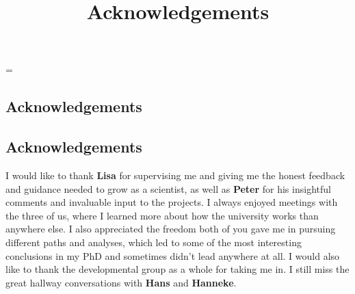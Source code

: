\emergencystretch=\maxdimen
{}


\begin{refsection}

\title{Acknowledgements}

\chapter{Acknowledgements}

\vspace{-2cm}

\section*{Acknowledgements}


I would like to thank \textbf{Lisa} for supervising me and giving me the honest feedback and guidance needed to grow as a scientist, as well as \textbf{Peter} for his insightful comments and invaluable input to the projects. I always enjoyed meetings with the three of us, where I learned more about how the university works than anywhere else. I also appreciated the freedom both of you gave me in pursuing different paths and analyses, which led to some of the most interesting conclusions in my PhD and sometimes didn’t lead anywhere at all. I would also like to thank the developmental group as a whole for taking me in. I still miss the great hallway conversations with \textbf{Hans} and \textbf{Hanneke}.


\end{refsection}
